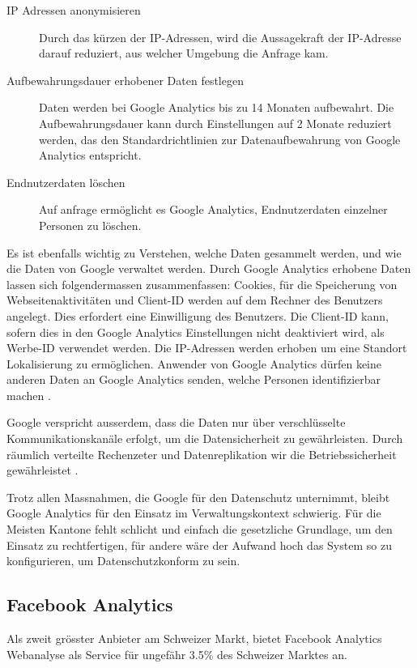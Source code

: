 \begin{description}
  \item[IP Adressen anonymisieren] Durch das kürzen der IP-Adressen, wird die Aussagekraft der IP-Adresse darauf reduziert, aus welcher Umgebung die Anfrage kam.
  \item[Aufbewahrungsdauer erhobener Daten festlegen] Daten werden bei Google Analytics bis zu 14 Monaten aufbewahrt. Die Aufbewahrungsdauer kann durch Einstellungen auf 2 Monate reduziert werden, das den Standardrichtlinien zur Datenaufbewahrung von Google Analytics entspricht.
  \item[Endnutzerdaten löschen] Auf anfrage ermöglicht es Google Analytics, Endnutzerdaten einzelner Personen zu löschen.   
\end{description}

Es ist ebenfalls wichtig zu Verstehen, welche Daten gesammelt werden, und wie die Daten von Google verwaltet werden. Durch Google Analytics erhobene Daten lassen sich folgendermassen zusammenfassen: Cookies, für die Speicherung von Webseitenaktivitäten und Client-ID werden auf dem Rechner des Benutzers angelegt. Dies erfordert eine Einwilligung des Benutzers. Die Client-ID kann, sofern dies in den Google Analytics Einstellungen nicht deaktiviert wird, als Werbe-ID verwendet werden. Die IP-Adressen werden erhoben um eine Standort Lokalisierung zu ermöglichen. Anwender von Google Analytics dürfen keine anderen Daten an Google Analytics senden, welche Personen identifizierbar machen \parencite{GoogleAnalyticsDatenschutz}.

Google verspricht ausserdem, dass die Daten nur über verschlüsselte Kommunikationskanäle erfolgt, um die Datensicherheit zu gewährleisten. Durch räumlich verteilte Rechenzeter und Datenreplikation wir die Betriebssicherheit gewährleistet \parencite{GoogleAnalyticsDatenschutz}.

Trotz allen Massnahmen, die Google für den Datenschutz unternimmt, bleibt Google Analytics für den Einsatz im Verwaltungskontext schwierig. Für die Meisten Kantone fehlt schlicht und einfach die gesetzliche Grundlage, um den Einsatz zu rechtfertigen, für andere wäre der Aufwand hoch das System so zu konfigurieren, um Datenschutzkonform zu sein. 

\subsection{Facebook Analytics}

Als zweit grösster Anbieter am Schweizer Markt, bietet Facebook Analytics Webanalyse als Service für ungefähr 3.5\% des Schweizer Marktes an.

